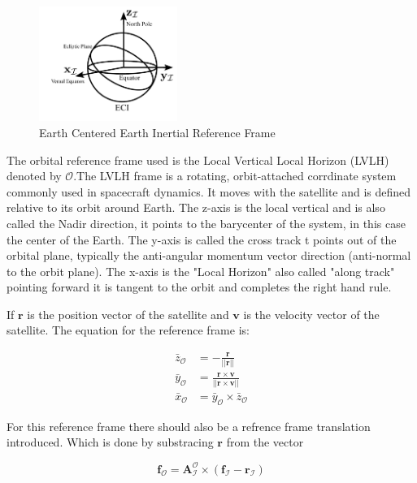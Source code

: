 \begin{figure}[H]
    \centering
    \includegraphics[width=0.4\textwidth]{figures/modelling/ECI.pdf}
    \caption{Earth Centered Earth Inertial Reference Frame}
    \label{fig:3.5}
\end{figure}


The orbital reference frame used is the Local Vertical Local Horizon (LVLH) denoted by $\mathcal{O}$.The LVLH frame is a rotating, orbit-attached corrdinate
system commonly used in spacecraft dynamics. It moves with the satellite and is defined relative to its orbit around Earth. The z-axis is the local vertical and is also called the Nadir direction, 
it points to the barycenter of the system, in this case the center of the Earth. The y-axis is called the cross track t points 
out of the orbital plane, typically the anti-angular momentum vector direction (anti-normal to the orbit plane). The x-axis is the "Local Horizon" also called
"along track" pointing forward it is tangent to the orbit and completes the right hand rule.
\vspace{0.5cm}

\noindent If $\mathbf{r}$ is the position vector of the satellite and $\mathbf{v}$ is the velocity vector of the satellite.
The equation for the reference frame is:

\begin{align}
    \bar{z}_{\mathcal{O}} &= -\frac{\mathbf{r}}{||\mathbf{r}||} \\
    \bar{y}_{\mathcal{O}} &= \frac{\mathbf{r}\times\mathbf{v}}{||\mathbf{r}\times\mathbf{v}||}\\
    \bar{x}_{\mathcal{O}} &= \bar{y}_{\mathcal{O}}\times\bar{z}_{\mathcal{O}}
\end{align}

\noindent For this reference frame there should also be a refrence frame translation introduced. Which is done by substracing $\mathbf{r}$ from the vector

\begin{equation}
    \mathbf{f}_{\mathcal{O}} = \mathbf{A}_{\mathcal{I}}^{\mathcal{O}}\times(\mathbf{f}_{\mathcal{I}} - \mathbf{r}_{\mathcal{I}})
\end{equation}

